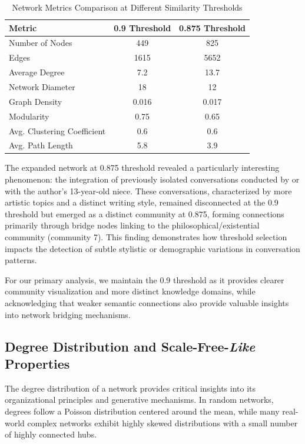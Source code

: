 \documentclass[10pt, a4paper]{article}
\begin{document}
\begin{table}
\centering
\caption{Network Metrics Comparison at Different Similarity Thresholds}
\label{tab:threshold_comparison}
\begin{tabular}{lcc}
\toprule
\textbf{Metric} & \textbf{0.9 Threshold} & \textbf{0.875 Threshold} \\
\midrule
Number of Nodes & 449 & 825 \\
Edges & 1615 & 5652 \\
Average Degree & 7.2 & 13.7 \\
Network Diameter & 18 & 12 \\
Graph Density & 0.016 & 0.017 \\
Modularity & 0.75 & 0.65 \\
Avg. Clustering Coefficient & 0.6 & 0.6 \\
Avg. Path Length & 5.8 & 3.9 \\
\bottomrule
\end{tabular}
\end{table}

The expanded network at 0.875 threshold revealed a particularly interesting phenomenon: the integration of previously isolated conversations conducted by or with the author's 13-year-old niece. These conversations, characterized by more artistic topics and a distinct writing style, remained disconnected at the 0.9 threshold but emerged as a distinct community at 0.875, forming connections primarily through bridge nodes linking to the philosophical/existential community (community 7). This finding demonstrates how threshold selection impacts the detection of subtle stylistic or demographic variations in conversation patterns.

For our primary analysis, we maintain the 0.9 threshold as it provides clearer community visualization and more distinct knowledge domains, while acknowledging that weaker semantic connections also provide valuable insights into network bridging mechanisms. 

\subsection{Degree Distribution and Scale-Free-\emph{Like} Properties}

The degree distribution of a network provides critical insights into its organizational principles and generative mechanisms. In random networks, degrees follow a Poisson distribution centered around the mean, while many real-world complex networks exhibit highly skewed distributions with a small number of highly connected hubs.
\end{document}
